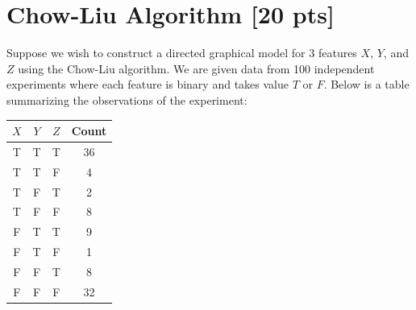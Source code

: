 \documentclass[a4paper]{article}
\theoremstyle{definition}
\begin{document}
\section{Chow-Liu Algorithm [20 pts]}
Suppose we wish to construct a directed graphical model for 3 features $X$, $Y$, and $Z$ using the Chow-Liu algorithm. We are given data from 100 independent experiments where each feature is binary and takes value $T$ or $F$. Below is a table summarizing the observations of the experiment:

\begin{table}[H]
        \centering
                \begin{tabular}{cccc}
                           $X$ & $Y$ & $Z$ & Count \\
                                \hline
                                T & T & T & 36 \\
                                \hline
                                T & T & F & 4 \\
                                \hline
                                T & F & T & 2 \\
                                \hline
                                T & F & F & 8 \\
                                \hline
                                F & T & T & 9 \\
                                \hline
                                F & T & F & 1 \\
                                \hline
                                F & F & T & 8 \\
                                \hline
                                F & F & F & 32 \\
                                \hline
                \end{tabular}
\end{table}
\end{document}

